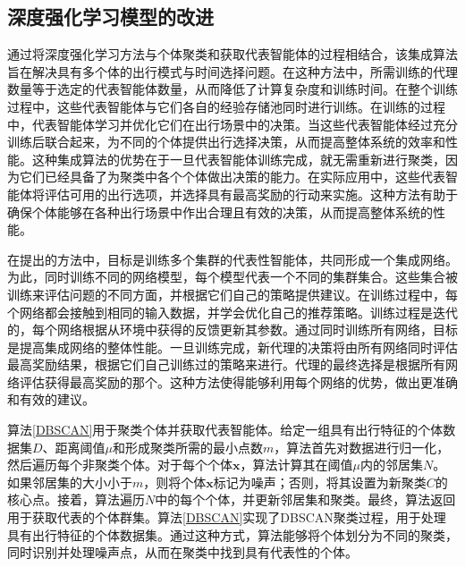 \subsection{深度强化学习模型的改进}
通过将深度强化学习方法与个体聚类和获取代表智能体的过程相结合，该集成算法旨在解决具有多个体的出行模式与时间选择问题。在这种方法中，所需训练的代理数量等于选定的代表智能体数量，从而降低了计算复杂度和训练时间。在整个训练过程中，这些代表智能体与它们各自的经验存储池同时进行训练。在训练的过程中，代表智能体学习并优化它们在出行场景中的决策。当这些代表智能体经过充分训练后联合起来，为不同的个体提供出行选择决策，从而提高整体系统的效率和性能。这种集成算法的优势在于一旦代表智能体训练完成，就无需重新进行聚类，因为它们已经具备了为聚类中各个个体做出决策的能力。在实际应用中，这些代表智能体将评估可用的出行选项，并选择具有最高奖励的行动来实施。这种方法有助于确保个体能够在各种出行场景中作出合理且有效的决策，从而提高整体系统的性能。

在提出的方法中，目标是训练多个集群的代表性智能体，共同形成一个集成网络。为此，同时训练不同的网络模型，每个模型代表一个不同的集群集合。这些集合被训练来评估问题的不同方面，并根据它们自己的策略提供建议。在训练过程中，每个网络都会接触到相同的输入数据，并学会优化自己的推荐策略。训练过程是迭代的，每个网络根据从环境中获得的反馈更新其参数。通过同时训练所有网络，目标是提高集成网络的整体性能。一旦训练完成，新代理的决策将由所有网络同时评估最高奖励结果，根据它们自己训练过的策略来进行。代理的最终选择是根据所有网络评估获得最高奖励的那个。这种方法使得能够利用每个网络的优势，做出更准确和有效的建议。

算法\ref{DBSCAN}用于聚类个体并获取代表智能体。给定一组具有出行特征的个体数据集$D$、距离阈值$\mu$和形成聚类所需的最小点数$m$，算法首先对数据进行归一化，然后遍历每个非聚类个体。对于每个个体$\bm{x}$，算法计算其在阈值$\mu$内的邻居集$N$。如果邻居集的大小小于$m$，则将个体$\bm{x}$标记为噪声；否则，将其设置为新聚类$C$的核心点。接着，算法遍历$N$中的每个个体，并更新邻居集和聚类。最终，算法返回用于获取代表的个体群集。算法\ref{DBSCAN}实现了DBSCAN聚类过程，用于处理具有出行特征的个体数据集。通过这种方式，算法能够将个体划分为不同的聚类，同时识别并处理噪声点，从而在聚类中找到具有代表性的个体。

